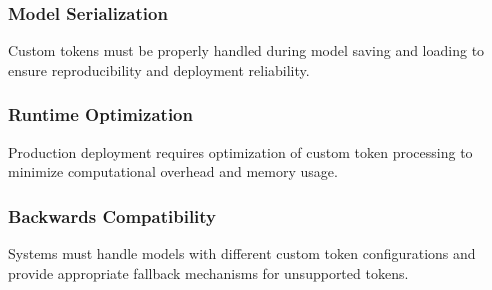 \subsubsection{Model Serialization}

Custom tokens must be properly handled during model saving and loading to ensure reproducibility and deployment reliability.

\subsubsection{Runtime Optimization}

Production deployment requires optimization of custom token processing to minimize computational overhead and memory usage.

\subsubsection{Backwards Compatibility}

Systems must handle models with different custom token configurations and provide appropriate fallback mechanisms for unsupported tokens.